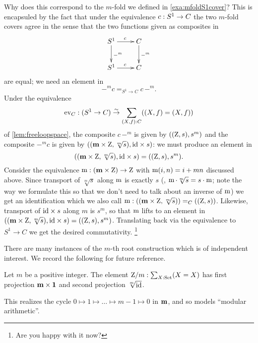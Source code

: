 \begin{example}
Why does this correspond to the $m$-fold \covering we defined in \cref{exa:mfoldS1cover}?  
This is encapsuled by the fact that under the equivalence $c:{S^1}\to C$ the two $m$-fold covers agree in the sense that the two functions given as composites in
$$\xymatrix{\Sc\ar[r]^c\ar[d]^{-^m}&C\ar[d]^{-^m}\\\Sc\ar[r]^c&C}$$ 
are equal; we need an element in
$$-^mc=_{S^1\to C}c\,-^m%
.$$
Under the equivalence 
$$\mathrm{ev}_C:(S^1\to C)\overset\sim\to \sum_{(X,f):C}((X,f)=(X,f))$$ of \cref{lem:freeloopspace}, the composite $c\,-^m$ is given by $((\mathrm{Z},s),s^m)$ 
and the composite $-^mc$ is given by 
$((\mathbf{m}\times\mathrm{Z},\sqrt[m]s),\mathord{\mathrm{id}}\times s)$: we must produce an element in 
$$((\mathbf{m}\times\mathrm{Z},\sqrt[m]s),\mathord{\mathrm{id}}\times s)=((\mathrm{Z},s),s^m).$$
Consider the equivalence  $\mathop{\mathrm{m}}: (\mathbf{m}\times \mathrm{Z})\to\mathrm{Z}$ with $\mathop{\mathrm{m}}(i,n)=i+mn$ discussed above.  Since transport of $\sqrt[m]s$ along $\mathop{\mathrm{m}}$ is exactly $s$ (\ie, $\mathop{\mathrm{m}}\cdot\sqrt[m]s=s\cdot\mathop{\mathrm{m}}$; 
note the way we formulate this so that we don't need to talk about an inverse of $\mathop{\mathrm{m}}$) we get an identification which we also call $\mathop{\mathrm{m}}:((\mathbf{m}\times\mathrm{Z},\sqrt[m]s))=_C((\mathrm{Z},s))$.  Likewise, transport of $\mathord{\mathrm{id}}\times s$ along $m$ is $s^m$, so that $\mathop{\mathrm{m}}$ lifts to an element in
$((\mathbf{m}\times\mathrm{Z},\sqrt[m]s),\mathord{\mathrm{id}}\times s)=((\mathrm{Z},s),s^m)$.  Translating back via the equivalence to $S^1\to C$ we get the desired commutativity.
\footnote{Are you happy with it now?   %
}
\end{example}


There are many instances of the $m$-th root construction which is of independent interest.  
We record the following for future reference.
\begin{definition} \label{def:Zetmodm}
Let $m$ be a positive integer.
The element $\mathrm{Z}/m:\sum_{X:\mathord{\mathrm{Set}}}(X=X)$ has first projection $\mathbf{m}\times\mathbf{1}$ and 
second projection $\sqrt[m]{\mathord{\mathrm{id}}}$.
\end{definition}
This realizes the cycle $0\mapsto1\mapsto\dots\mapsto m-1\mapsto 0$ in $\mathbf{m}$, and so models ``modular arithmetic''.


